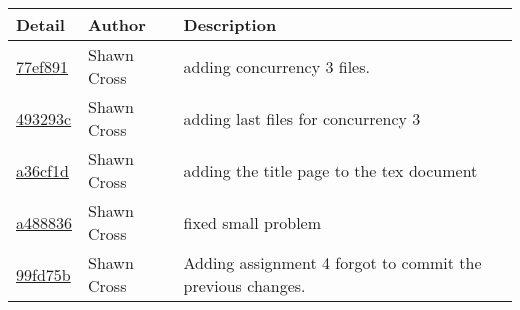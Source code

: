\begin{tabular}{l l l}\textbf{Detail} & \textbf{Author} & \textbf{Description}\\\hline
\href{https://github.com/crosssh/CS444/commit/77ef8915c0518852fc5179cfdcd9d13c765f43b0}{77ef891} & Shawn Cross & adding concurrency 3 files.\\\hline
\href{https://github.com/crosssh/CS444/commit/493293c4ed6f02fa0ae80b534699703d705665b9}{493293c} & Shawn Cross & adding last files for concurrency 3\\\hline
\href{https://github.com/crosssh/CS444/commit/a36cf1d987dc262bd9055c419b370a4d2b430c38}{a36cf1d} & Shawn Cross & adding the title page to the tex document\\\hline
\href{https://github.com/crosssh/CS444/commit/a488836077a629fcc0e9ef43ac11cec51df94038}{a488836} & Shawn Cross & fixed small problem\\\hline
\href{https://github.com/crosssh/CS444/commit/99fd75bdfb7c68d9498469a85f246ba4db9aa885}{99fd75b} & Shawn Cross & Adding assignment 4 forgot to commit the previous changes.\\\hline\end{tabular}
